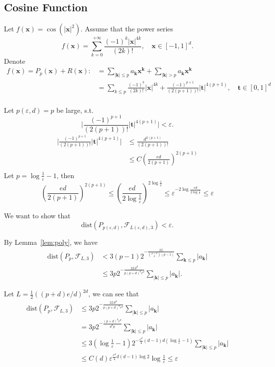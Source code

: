 \subsection{Cosine Function}

Let $f(\bm x) = \cos(|\bm x|^2)$. Assume that the power series 
\[
f(\bm x) = \sum_{k=0}^{+\infty} \frac{(-1)^k|\bm x|^{4k}}{(2k)!},\quad \bm x\in [-1,1]^d.
\]
Denote
\[
\begin{split}
f(\bm x) = P_p(\bm x) + R(\bm x): &= \sum_{|\bm k|\le p}a_{\bm k} \bm x^{\bm k} + \sum_{|\bm k|>p} a_{\bm k} \bm x^{\bm k}\\
&=\sum_{k\le p} \frac{(-1)^k}{(2k)!}|\bm x|^{4 k} + \frac{(-1)^{p+1}}{(2(p+1))!}|\bm t|^{4 (p+1)},\quad \bm t\in[0,1]^d\\
\end{split}
\]


Let $p(\varepsilon,d)=p$ be large, s.t.
\[
\big|\frac{(-1)^{p+1}}{(2(p+1))!}|\bm t|^{4(p+1)}\big| < \varepsilon.
\]
\[
\begin{split}
\big|\frac{(-1)^{p+1}}{(2(p+1))!}|\bm t|^{4 (p+1)}\big| &\le \frac{d^{2(p+1)}}{(2(p+1))!}\\
& \le C(\frac{ed}{2(p+1)})^{2(p+1)}\\
\end{split}
\]
Let $p = \log \frac{1}{\varepsilon}-1$, then 
\[
(\frac{ed}{2(p+1)})^{2(p+1)}\le (\frac{ed}{2\log \frac{1}{\varepsilon}})^{2\log\frac{1}{\varepsilon}}\le \varepsilon^{-2\log \frac{ed}{2\log \frac{1}{\varepsilon}}}\le \varepsilon
\]

We want to show that 
\[
\mbox{dist}(P_{p(\varepsilon,d)},\mathcal{F}_{L(\varepsilon,d),3})<\varepsilon.
\]

By Lemma~\ref{lem:poly}, we have 
\[
\begin{split}
\mbox{dist}(P_{p},\mathcal{F}_{L,3})&<3(p-1)2^{-\frac{2L}{\binom{p+d}{d}(p-1)}}\sum_{\bm k\le p}|a_{\bm k}|\\
&\le3p2^{-\frac{2Ld^d}{p(p+d)^de^d}}\sum_{|\bm k|\le p}|a_{\bm k}|.
\end{split}
\]

Let $L = \frac{1}{2} ((p+d)e/d)^{2d}$, we can see that
\[
\begin{split}
\mbox{dist}(P_{p},\mathcal{F}_{L,3})
&\le3p2^{-\frac{2Ld^d}{p(p+d)^de^d}}\sum_{|\bm k|\le p}|a_{\bm k}|\\
&= 3p2^{-\frac{(p+d)^de^d}{d^dp}}\sum_{|\bm k|\le p}|a_{\bm k}|\\
&\le 3(\log \frac{1}{\varepsilon}-1)2^{-\frac{e^d}{4}(d-1)d(\log \frac{1}{\varepsilon}-1)} \sum_{|\bm k|\le p}|a_{\bm k}|\\
&\le C(d)\varepsilon^{\frac{e^d}{4}d(d-1)\log 2}\log\frac{1}{\varepsilon}\le \varepsilon
\end{split}
\]

